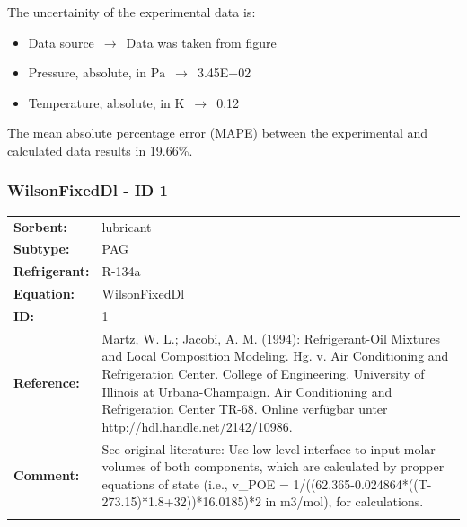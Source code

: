 The uncertainity of the experimental data is:
\begin{itemize}
\item Data source $\,\to\,$ Data was taken from figure
\item Pressure, absolute, in $\si{\pascal}$ $\,\to\,$ 3.45E+02
\item Temperature, absolute, in $\si{\kelvin}$ $\,\to\,$ 0.12
\end{itemize}

The mean absolute percentage error (MAPE) between the experimental and calculated data results in 19.66\%.
\FloatBarrier
\newpage
\subsubsection{WilsonFixedDl - ID 1}
%
\begin{tabular}[l]{|lp{11.5cm}|}
\hline
\addlinespace

\textbf{Sorbent:} & lubricant \\
\textbf{Subtype:} & PAG \\
\textbf{Refrigerant:} & R-134a \\
\textbf{Equation:} & WilsonFixedDl \\
\textbf{ID:} & 1 \\
\textbf{Reference:} & Martz, W. L.; Jacobi, A. M. (1994): Refrigerant-Oil Mixtures and Local Composition Modeling. Hg. v. Air Conditioning and Refrigeration Center. College of Engineering. University of Illinois at Urbana-Champaign. Air Conditioning and Refrigeration Center TR-68. Online verfügbar unter http://hdl.handle.net/2142/10986. \\
\textbf{Comment:} & See original literature: Use low-level interface to input molar volumes of both components, which are calculated by propper equations of state (i.e., v\_POE =  1/((62.365-0.024864*((T-273.15)*1.8+32))*16.0185)*2 in m3/mol), for calculations. \\

\addlinespace
\hline
\end{tabular}
\newline

